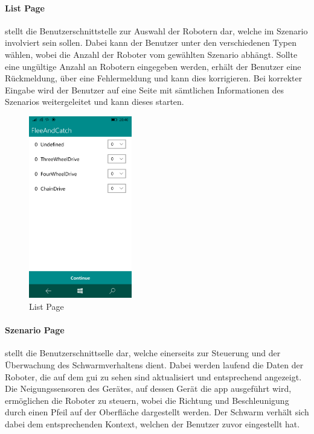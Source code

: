 \newpage
\paragraph{List Page} stellt die Benutzerschnittstelle zur Auswahl der Robotern dar, welche im Szenario involviert sein sollen. Dabei kann der Benutzer unter den verschiedenen Typen wählen, wobei die Anzahl der Roboter vom gewählten Szenario abhängt. Sollte eine ungültige Anzahl an Robotern eingegeben werden, erhält der Benutzer eine Rückmeldung, über eine Fehlermeldung und kann dies korrigieren. Bei korrekter Eingabe wird der Benutzer auf eine Seite mit sämtlichen Informationen des Szenarios weitergeleitet und kann dieses starten.\\

\bigskip

\begin{figure}[h]
	\begin{center}
		\includegraphics[width=0.4\textwidth]{images/implementation/list.png}
	\end{center}	
	\caption{List Page}
	\label{fig:list}
\end{figure}

\newpage
\paragraph{Szenario Page} stellt die Benutzerschnittselle dar, welche einerseits zur Steuerung und der Überwachung des Schwarmverhaltens dient. Dabei werden laufend die Daten der Roboter, die auf dem \gls{gui} zu sehen sind aktualisiert und entsprechend angezeigt. Die Neigungssensoren des Gerätes, auf dessen Gerät die \gls{app} ausgeführt wird, ermöglichen die Roboter zu steuern, wobei die Richtung und Beschleunigung durch einen Pfeil auf der Oberfläche dargestellt werden. Der Schwarm verhält sich dabei dem entsprechenden Kontext, welchen der Benutzer zuvor eingestellt hat.\\

